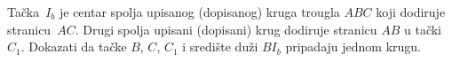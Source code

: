 \problem{}
Tačka~$I_b$ je centar spolja upisanog (dopisanog) kruga trougla $ABC$ koji dodiruje stranicu~$AC$.
Drugi spolja upisani (dopisani) krug dodiruje stranicu $AB$ u tački $C_1$.
Dokazati da tačke $B$, $C$, $C_1$ i središte duži $B I_b$ pripadaju jednom krugu.
\solution
\endproblem
